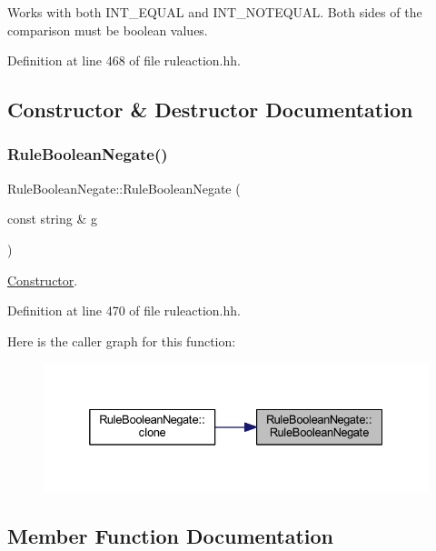 Works with both I\+N\+T\+\_\+\+E\+Q\+U\+AL and I\+N\+T\+\_\+\+N\+O\+T\+E\+Q\+U\+AL. Both sides of the comparison must be boolean values. 

Definition at line 468 of file ruleaction.\+hh.



\subsection{Constructor \& Destructor Documentation}
\mbox{\label{class_rule_boolean_negate_a40fd475a9f7d9cd831aee240d196810f}} 
\subsubsection{\texorpdfstring{RuleBooleanNegate()}{RuleBooleanNegate()}}
{\footnotesize\ttfamily Rule\+Boolean\+Negate\+::\+Rule\+Boolean\+Negate (\begin{DoxyParamCaption}\item[{const string \&}]{g }\end{DoxyParamCaption})\hspace{0.3cm}{\ttfamily [inline]}}



\mbox{\hyperlink{class_constructor}{Constructor}}. 



Definition at line 470 of file ruleaction.\+hh.

Here is the caller graph for this function\+:
\nopagebreak
\begin{figure}[H]
\begin{center}
\leavevmode
\includegraphics[width=332pt]{class_rule_boolean_negate_a40fd475a9f7d9cd831aee240d196810f_icgraph}
\end{center}
\end{figure}


\subsection{Member Function Documentation}
\mbox{\label{class_rule_boolean_negate_a8c8aa1437392ae57f49b56f314233bab}} 
